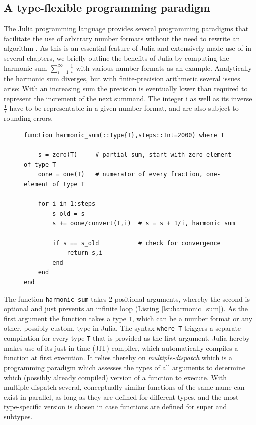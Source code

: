 \subsection{A type-flexible programming paradigm}

The Julia programming language provides several programming paradigms that facilitate the use of arbitrary number formats
without the need to rewrite an algorithm \citep{Bezanson2017}. As this is an essential feature of Julia and extensively made 
use of in several chapters, we briefly outline the benefits of Julia by computing the harmonic sum
$\sum_{i=1}^\infty \tfrac{1}{i}$ with various number formats as an example. Analytically the harmonic sum diverges, but with
finite-precision arithmetic several issues arise: With an increasing sum the precision is eventually lower than required to
represent the increment of the next summand. The integer i as well as its inverse $\tfrac{1}{i}$ have to be representable
in a given number format, and are also subject to rounding errors.

\begin{figure}[tbhp]
\begin{lstlisting}[language=JuliaLocal, label=lst:harmonic_sum, caption={\textbf{A type-flexible function calculating the harmonic sum in Julia.}
The number format is passed on as type in the first argument. The syntax \texttt{where T} triggers a separate compilation for every number
format. The function \texttt{harmonic\_sum} is type-stable as all types inside the function are declared and therefore unambiguous to the
compiler.}]
function harmonic_sum(::Type{T},steps::Int=2000) where T

    s = zero(T)     # partial sum, start with zero-element of type T
    oone = one(T)   # numerator of every fraction, one-element of type T

    for i in 1:steps
        s_old = s
        s += oone/convert(T,i)  # s = s + 1/i, harmonic sum

        if s == s_old           # check for convergence
            return s,i
        end
    end
end
\end{lstlisting}
\end{figure}

The function \texttt{harmonic\_sum} takes 2 positional arguments, whereby the second is optional and just prevents an
infinite loop (Listing \ref{lst:harmonic_sum}). As the first argument the function takes a type \texttt{T}, which can be a
number format or any other, possibly custom, type in Julia. The syntax \texttt{where T} triggers a separate compilation
for every type \texttt{T} that is provided as the first argument. Julia hereby makes use of its just-in-time (JIT) compiler,
which automatically compiles a function at first execution. It relies thereby on \emph{multiple-dispatch} which is a
programming paradigm which assesses the types of all arguments to determine which (possibly already compiled)
version of a function to execute. With multiple-dispatch several, conceptually similar functions
of the same name can exist in parallel, as long as they are defined for different types, and the most
type-specific version is chosen in case functions are defined for super and subtypes.


